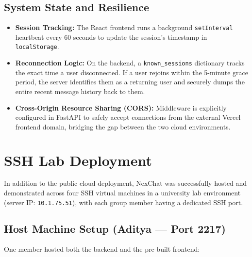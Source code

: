 \documentclass[12pt, a4paper]{article}
\begin{document}
\subsection{System State and Resilience}
\begin{itemize}
    \item \textbf{Session Tracking:} The React frontend runs a background \texttt{setInterval} heartbeat every 60 seconds to update the session's timestamp in \texttt{localStorage}. 
    \item \textbf{Reconnection Logic:} On the backend, a \texttt{known\_sessions} dictionary tracks the exact time a user disconnected. If a user rejoins within the 5-minute grace period, the server identifies them as a returning user and securely dumps the entire recent message history back to them.
    \item \textbf{Cross-Origin Resource Sharing (CORS):} Middleware is explicitly configured in FastAPI to safely accept connections from the external Vercel frontend domain, bridging the gap between the two cloud environments.
\end{itemize}

\section{SSH Lab Deployment}
In addition to the public cloud deployment, NexChat was successfully hosted and demonstrated across four SSH virtual machines in a university lab environment (server IP: \texttt{10.1.75.51}), with each group member having a dedicated SSH port.

\subsection{Host Machine Setup (Aditya — Port 2217)}
One member hosted both the backend and the pre-built frontend:
\end{document}
